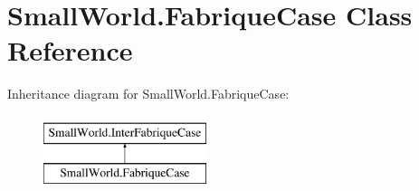 \hypertarget{class_small_world_1_1_fabrique_case}{\section{Small\-World.\-Fabrique\-Case Class Reference}
\label{class_small_world_1_1_fabrique_case}
}
Inheritance diagram for Small\-World.\-Fabrique\-Case\-:\begin{figure}[H]
\begin{center}
\leavevmode
\includegraphics[height=2.000000cm]{class_small_world_1_1_fabrique_case}
\end{center}
\end{figure}
